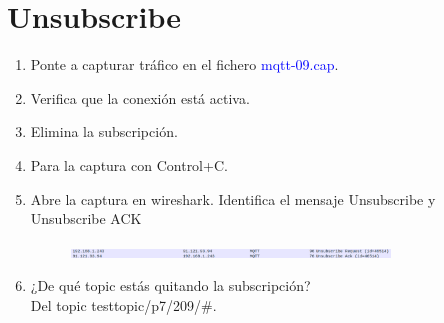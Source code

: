 \documentclass[12pt, a4paper]{report}
\begin{document}
\chapter{Unsubscribe}
\begin{enumerate}
	\item Ponte a capturar tráfico en el fichero \textcolor{blue}{mqtt-09.cap}.
	\item Verifica que la conexión está activa.
	\item Elimina la subscripción.
	\item Para la captura con Control+C.
	\item Abre la captura en wireshark. Identifica el mensaje Unsubscribe y Unsubscribe ACK
	\begin{figure}[H]
		\centering
		\includegraphics[width=0.8\textwidth]{ej10.5}
	\end{figure}
	\item ¿De qué topic estás quitando la subscripción?\\
	
	Del topic testtopic/p7/209/\#.
\end{enumerate}
\end{document}
